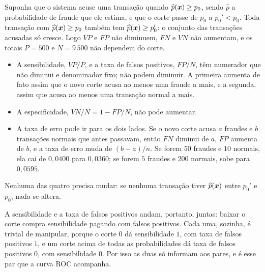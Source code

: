 \documentclass[11pt,a4paper]{article}
\begin{document}
\begin{solucao}
Suponha que o sistema acuse uma transação quando $\widehat p(\bm{x})\ge p_0$, sendo
$\widehat p$ a probabilidade de fraude que ele estima, e que o corte passe de $p_0$ a
$p_0'<p_0$. Toda transação com $\widehat p(\bm{x})\ge p_0$ também tem
$\widehat p(\bm{x})\ge p_0'$:
o conjunto das transações acusadas só cresce. Logo $VP$ e $FP$ não diminuem, $FN$ e
$VN$ não aumentam, e os totais $P=500$ e $N=9\,500$ não dependem do corte.
\begin{itemize}[leftmargin=1.4cm]
  \item A sensibilidade, $VP/P$, e a taxa de falsos positivos, $FP/N$, têm numerador
        que não diminui e denominador fixo; não podem diminuir. A primeira aumenta de
        fato assim que o novo corte acusa ao menos uma fraude a mais, e a segunda,
        assim que acusa ao menos uma transação normal a mais.
  \item A especificidade, $VN/N=1-FP/N$, não pode aumentar.
  \item A taxa de erro pode ir para os dois lados. Se o novo corte acusa $a$ fraudes e
        $b$ transações normais que antes passavam, então $FN$ diminui de $a$, $FP$
        aumenta de $b$, e a taxa de erro muda de $(b-a)/n$. Se forem $50$ fraudes e
        $10$ normais, ela cai de $0{,}0400$ para $0{,}0360$; se forem $5$ fraudes e
        $200$ normais, sobe para $0{,}0595$.
\end{itemize}
Nenhuma das quatro precisa mudar: se nenhuma transação tiver $\widehat p(\bm{x})$ entre
$p_0'$ e $p_0$, nada se altera.

A sensibilidade e a taxa de falsos positivos andam, portanto, juntas: baixar o corte
compra sensibilidade pagando com falsos positivos. Cada uma, sozinha, é trivial de
manipular, porque o corte $0$ dá sensibilidade $1$, com taxa de falsos positivos $1$,
e um corte acima de todas as probabilidades dá taxa de falsos positivos $0$, com
sensibilidade $0$. Por isso as duas só informam aos pares, e é esse par que a curva
ROC acompanha.
\end{solucao}
\end{document}
